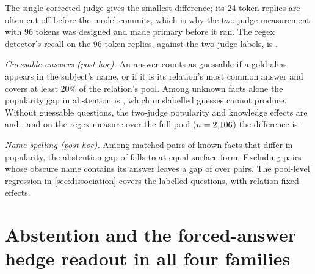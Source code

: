 \documentclass{article}
\begin{document}
The single corrected judge gives the smallest difference; its 24-token replies are often cut off before the model commits, which is why the two-judge measurement with 96 tokens was designed and made primary before it ran. The regex detector's recall on the 96-token replies, against the two-judge labels, is \hmLlamaRegexRecall.

\emph{Guessable answers (post hoc).} An answer counts as guessable if a gold alias appears in the subject's name, or if it is its relation's most common answer and covers at least 20\% of the relation's pool. Among unknown facts alone the popularity gap in abstention is \hmLlamaPopUnkOnly{} \hmLlamaPopUnkOnlyCI, which mislabelled guesses cannot produce. Without guessable questions, the two-judge popularity and knowledge effects are \gsPop{} and \gsKnow{}, and on the regex measure over the full pool ($n=2{,}106$) the difference is \gsRegexDiff{} \gsRegexDiffCI.

\emph{Name spelling (post hoc).} Among \scPopKnownPairs{} matched pairs of known facts that differ in popularity, the abstention gap of \scPopKnownGap{} falls to \scPopKnownGapSurface{} \scPopKnownGapSurfaceCI{} at equal surface form. Excluding pairs whose obscure name contains its answer leaves a gap of \scNonInferGap{} over \scNonInferN{} pairs. The pool-level regression in \cref{sec:dissociation} covers the \faLlamaN{} labelled questions, with relation fixed effects.

\section{Abstention and the forced-answer hedge readout in all four families}
\label{app:families}
\end{document}

